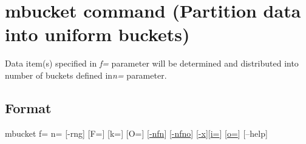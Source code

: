 \documentclass[a4paper]{jarticle}
\begin{document}
\setlength{\baselineskip}{4mm}

\section*{mbucket command (Partition data into uniform buckets) }
Data item(s) specified in \emph{f=} parameter will be determined and distributed into number of buckets defined in\emph{n=} parameter.  

\subsection*{Format}
mbucket f= n= [-rng] [F=] [k=] [O=]  [\href{run:nfn.pdf}{-nfn}] [\href{run:nfno.pdf}{-nfno}]  [\href{run:x.pdf}{-x}][\href{run:i.pdf}{i=}] [\href{run:o.pdf}{o=}] [--help]\\
\end{document}
